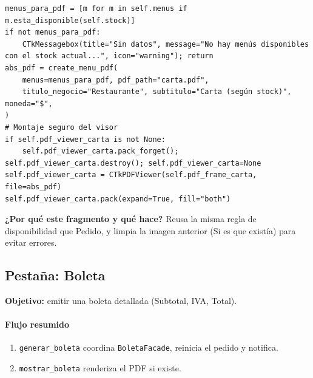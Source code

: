 \documentclass[12pt,a4paper]{article}
\begin{document}
\begin{tcolorbox}[colback=purple!6,colframe=purple!60!black,title=Highlight de código — Carta (\texttt{generar\_y\_mostrar\_carta\_pdf})]
\lstset{style=pyclean}
\begin{lstlisting}
menus_para_pdf = [m for m in self.menus if m.esta_disponible(self.stock)]
if not menus_para_pdf:
    CTkMessagebox(title="Sin datos", message="No hay menús disponibles con el stock actual...", icon="warning"); return
abs_pdf = create_menu_pdf(
    menus=menus_para_pdf, pdf_path="carta.pdf",
    titulo_negocio="Restaurante", subtitulo="Carta (según stock)", moneda="$",
)
# Montaje seguro del visor
if self.pdf_viewer_carta is not None:
    self.pdf_viewer_carta.pack_forget(); self.pdf_viewer_carta.destroy(); self.pdf_viewer_carta=None
self.pdf_viewer_carta = CTkPDFViewer(self.pdf_frame_carta, file=abs_pdf)
self.pdf_viewer_carta.pack(expand=True, fill="both")
\end{lstlisting}
\textbf{¿Por qué este fragmento y qué hace?} Reusa la misma regla de disponibilidad que Pedido, y limpia la imagen anterior (Si es que existía) para evitar errores.
\end{tcolorbox}
\newpage

\subsection{Pestaña: Boleta}
\textbf{Objetivo:} emitir una boleta detallada (Subtotal, IVA, Total).

\paragraph{Flujo resumido}
\begin{enumerate}[leftmargin=*]
  \item \texttt{generar\_boleta} coordina \texttt{BoletaFacade}, reinicia el pedido y notifica.
  \item \texttt{mostrar\_boleta} renderiza el PDF si existe.
\end{enumerate}
\end{document}
